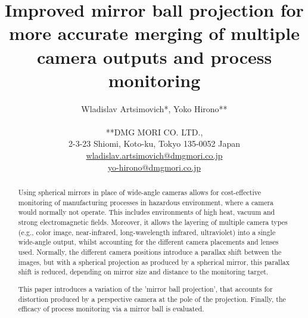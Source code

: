 \documentclass[10pt]{article}
\begin{document}
\title{Improved mirror ball projection for more accurate merging of multiple camera outputs and process monitoring}

\author{Wladislav Artsimovich*, Yoko Hirono** \\
	\\
	**DMG MORI CO. LTD.,\\
	2-3-23 Shiomi, Koto-ku, Tokyo 135-0052 Japan\\
	\href{mailto:wladislav.artsimovich@dmgmori.co.jp}{wladislav.artsimovich@dmgmori.co.jp}  \\
	\href{mailto:wladislav.artsimovich@dmgmori.co.jp}{yo-hirono@dmgmori.co.jp}  \\
}

\maketitle

\begin{abstract}
	Using spherical mirrors in place of wide-angle cameras allows for cost-effective monitoring of manufacturing processes in hazardous environment, where a camera would normally not operate. This includes environments of high heat, vacuum and strong electromagnetic fields. Moreover, it allows the layering of multiple camera types (e.g., color image, near-infrared, long-wavelength infrared, ultraviolet) into a single wide-angle output, whilst accounting for the different camera placements and lenses used. Normally, the different camera positions introduce a parallax shift between the images, but with a spherical projection as produced by a spherical mirror, this parallax shift is reduced, depending on mirror size and distance to the monitoring target.

	This paper introduces a variation of the 'mirror ball projection', that accounts for distortion produced by a perspective camera at the pole of the projection. Finally, the efficacy of process monitoring via a mirror ball is evaluated.
\end{abstract}

\end{document}
